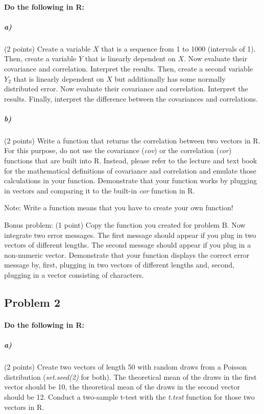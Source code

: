 \documentclass[12pt,letter]{article}
\begin{document}
\paragraph{Do the following in R:}

\subparagraph{a)} (2 points) Create a variable $X$ that is a sequence from 1 to 1000 (intervals of 1). Then, create a variable $Y$ that is linearly dependent on $X$. Now evaluate their covariance and correlation. Interpret the results. Then, create a second variable $Y_2$ that is linearly dependent on $X$ but additionally has some normally distributed error. Now evaluate their covariance and correlation. Interpret the results. Finally, interpret the difference between the covariances and correlations.

\subparagraph{b)} (2 points) Write a function that returns the correlation between two vectors in R. For this purpose, do not use the covariance (\textit{cov}) or the correlation (\textit{cor}) functions that are built into R. Instead, please refer to the lecture and text book for the mathematical definitions of covariance and correlation and emulate those calculations in your function. Demonstrate that your function works by plugging in vectors and comparing it to the built-in \textit{cor} function in R.

\bigskip

Note: Write a function means that you have to create your own function!

\bigskip

Bonus problem: (1 point) Copy the function you created for problem B. Now integrate two error messages. The first message should appear if you plug in two vectors of different lengths. The second message should appear if you plug in a non-numeric vector. Demonstrate that your function displays the correct error message by, first, plugging in two vectors of different lengths and, second, plugging in a vector consisting of characters.



\subsection*{Problem 2}

\paragraph{Do the following in R:}

\subparagraph{a)} (2 points) Create two vectors of length 50 with random draws from a Poisson distribution (\textit{set.seed(2)} for both). The theoretical mean of the draws in the first vector should be 10, the theoretical mean of the draws in the second vector should be 12. Conduct a two-sample t-test with the \textit{t.test} function for those two vectors in R.
\end{document}
